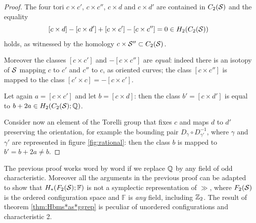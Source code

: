\begin{proof}
The four tori $c\times c'$, $c\times c''$, $c\times d$ and $c\times d'$ are contained in $C_2(\S)$
and the equality
\[
 [c\times d]-[c\times d']+[c\times c']-[c\times c'']=0\in H_2(C_2(\S))
\]
holds, as witnessed by the homology $c\times \S''\subset C_2(\S)$.

Moreover the classes $[c\times c']$ and $-[c\times c'']$ are \emph{equal}:
indeed there is an isotopy of $\S$ mapping $c$ to $c'$ and $c''$ to $c$,
as oriented curves; the class $[c\times c'']$ is mapped to the class $[c'\times c]=-[c\times c']$.

Let again $a=[c\times c']$ and let $b=[c\times d]$: then the class $b'=[c\times d']$
is equal to $b+2a\in H_2(C_2(\S);\Q)$.

Consider now an element of the Torelli group that fixes $c$ and maps $d$ to $d'$ preserving
the orientation, for example the bounding pair $D_{\gamma}\circ D_{\gamma'}^{-1}$, where
$\gamma$ and $\gamma'$ are represented in figure \ref{fig:rational}:
then the class $b$ is mapped to $b'=b+2a\neq b$.
\end{proof}

The previous proof works word by word if we replace $\Q$ by any field of odd characteristic. Moreover
all the arguments in the previous proof can be adapted to show that $H_*(F_2(\S);\mathbb{F})$ is
not a symplectic representation of $\gg$, where $F_2(\S)$ is the ordered configuration space
and $\mathbb{F}$ is \emph{any} field, including $\Z_2$. The result of theorem \ref{thm:Hbms*as*ggrep}
is peculiar of unordered configurations and characteristic 2.